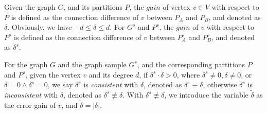 \documentclass{sig-alternate-2013}
\begin{document}
\begin{definition}\label{def-gain}
 Given the graph $G$, and its partitions $P$, the $gain$ of vertex $v \in V$ with respect to $P$ is defined as the connection difference of $v$ between $P_A$ and $P_B$, and denoted as $\delta$.
 Obviously, we have $-d\leq\delta\leq d$. For $G^s$ and $P^s$, the $gain$ of $v$ with respect to $P^s$ is defined as the connection difference of $v$ between $P_A^s$ and $P_B^s$, and  denoted as $\delta^s$.
\end{definition}

\begin{definition}\label{def-inconsistgain}
For the graph $G$ and the graph sample $G^s$, and the corresponding partitions $P$ and $P^s$, given the vertex $v$ and its degree $d$,
if $\delta^s \cdot \delta >0$, where $\delta^s \neq 0, \delta \neq 0$, or $\delta=0 \land \delta^s =0$,
we say $\delta^s$ is \textit{consistent} with $\delta$, denoted as  $\delta^s \equiv \delta $,
otherwise  $\delta^s$ is \textit{inconsistent} with $\delta$, denoted as $\delta^s \not\equiv \delta $.
With $\delta^s \not\equiv \delta $, we introduce the variable $\tilde\delta$ as the error gain of $v$, and $\tilde\delta = |\delta| $.
\end{definition}
\end{document}
